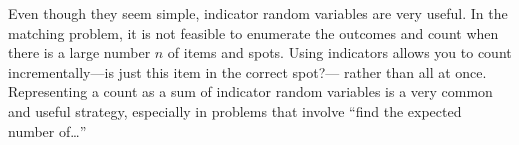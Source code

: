 \documentclass[
  letterpaper,
  DIV=11,
  numbers=noendperiod]{scrreprt}
\theoremstyle{plain}
\theoremstyle{definition}
\theoremstyle{definition}
\theoremstyle{definition}
\theoremstyle{remark}
\begin{document}
\begin{table}

\caption{\label{tbl-matching-indicator-tab}Total number of matches and
indicator random variables for each item in the matching problem with
\(n=4\).}


\end{table}%

Even though they seem simple, indicator random variables are very
useful. In the matching problem, it is not feasible to enumerate the
outcomes and count when there is a large number \(n\) of items and
spots. Using indicators allows you to count incrementally---is just this
item in the correct spot?--- rather than all at once. Representing a
count as a sum of indicator random variables is a very common and useful
strategy, especially in problems that involve ``find the expected number
of\ldots{}''
\end{document}

